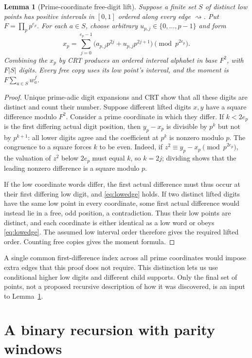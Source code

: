 \documentclass[11pt]{article}
\newtheorem{lemma}[theorem]{Lemma}
\theoremstyle{definition}
\theoremstyle{remark}
\newcommand{\card}[1]{\lvert #1\rvert}
\begin{document}
\begin{lemma}[Prime-coordinate free-digit lift]\label{lem:odd}
Suppose a finite set $S$ of distinct low points has positive intervals in
$[0,1]$ ordered along every edge $\rightsquigarrow$.
Put $F=\prod_pp^{e_p}$. For each $a\in S$, choose arbitrary
$u_{p,j}\in\{0,\ldots,p-1\}$ and form
\begin{equation}\label{eq:oddlift}
 x_p=\sum_{j=0}^{e_p-1}
       \bigl(a_{p,j}p^{2j}+u_{p,j}p^{2j+1}\bigr)\pmod{p^{2e_p}}.
\end{equation}
Combining the $x_p$ by CRT produces an ordered interval alphabet in base
$F^2$, with $F\card S$ digits. Every free copy uses its low point's interval,
and the moment is $F\sum_{a\in S}w_a^f$.
\end{lemma}
\begin{proof}
Unique prime-adic digit expansions and CRT show that all these digits are
distinct and count their number. Suppose different lifted digits $x,y$
have a square difference modulo $F^2$. Consider a prime coordinate in which
they differ. If $k<2e_p$ is the first differing actual digit position, then
$y_p-x_p$ is divisible by $p^k$ but not by $p^{k+1}$: all lower digits
agree and the coefficient at $p^k$ is nonzero modulo $p$.
The congruence to a square forces $k$ to be even. Indeed, if
$z^2\equiv y_p-x_p\pmod{p^{2e_p}}$, the valuation of $z^2$ below
$2e_p$ must equal $k$, so $k=2j$; dividing shows that the leading nonzero
difference is a square modulo $p$.

If the low coordinate words differ, the first actual difference must thus
occur at their first differing low digit, and \eqref{eq:lowedge} holds.
If two distinct lifted digits have the same low point in every coordinate,
some first actual difference would instead lie in a free, odd position,
a contradiction. Thus their low points are distinct, and each coordinate
is either identical as a low word or obeys \eqref{eq:lowedge}. The assumed
low interval order therefore gives the required lifted order. Counting
free copies gives the moment formula.
\end{proof}

A single common first-difference index across all prime coordinates would
impose extra edges that this proof does not require. This distinction lets
us use conditional higher low digits and different child supports.
Only the final set of points, not a proposed recursive description of how
it was discovered, is an input to Lemma~\ref{lem:odd}.

\section{A binary recursion with parity windows}\label{sec:binary}
\end{document}
